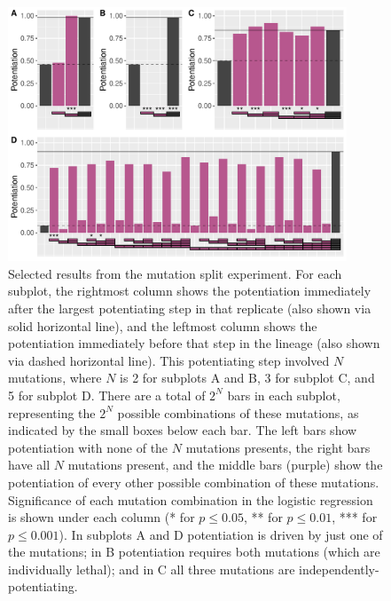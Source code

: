 \begin{figure}[h!]
\begin{center}
\includegraphics[width=0.9\textwidth]{04_learning_extension/media/mut_splits.pdf}
\end{center}
\caption{ 
Selected results from the mutation split experiment. 
For each subplot, the rightmost column shows the potentiation immediately after the largest potentiating step in that replicate (also shown via solid horizontal line), and the leftmost column shows the potentiation immediately before that step in the lineage (also shown via dashed horizontal line). 
This potentiating step involved $N$ mutations, where $N$ is 2 for subplots A and B, 3 for subplot C, and 5 for subplot D.
There are a total of $2^N$ bars in each subplot, representing the $2^N$ possible combinations of these mutations, as indicated by the small boxes below each bar.
The left bars show potentiation with none of the $N$ mutations presents, the right bars have all $N$ mutations present,
and the middle bars (purple) show the potentiation of every other possible combination of these mutations. 
Significance of each mutation combination in the logistic regression is shown under each column (* for $p \leq 0.05$, ** for $p \leq 0.01$, *** for $p \leq 0.001$). 
In subplots A and D potentiation is driven by just one of the mutations; in B potentiation requires both mutations (which are individually lethal); and in C all three mutations are independently-potentiating. 
}\label{fig:mut_splits}
\end{figure}

